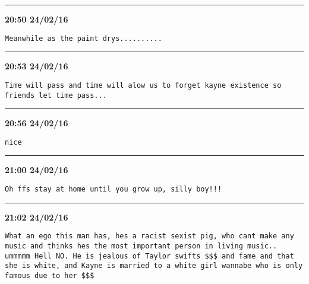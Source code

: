 \hrule%

\begin{adjustwidth}{0cm}{0cm}
\footnotesize \textbf{20:50 24/02/16}

\begin{lstlisting}[breaklines, breakatwhitespace, basicstyle=\small, frame=leftline]
Meanwhile as the paint drys..........
\end{lstlisting}
\end{adjustwidth}

\hrule%

\begin{adjustwidth}{0cm}{0cm}
\footnotesize \textbf{20:53 24/02/16}

\begin{lstlisting}[breaklines, breakatwhitespace, basicstyle=\small, frame=leftline]
Time will pass and time will alow us to forget kayne existence so friends let time pass...
\end{lstlisting}
\end{adjustwidth}

\hrule%

\begin{adjustwidth}{0cm}{0cm}
\footnotesize \textbf{20:56 24/02/16}

\begin{lstlisting}[breaklines, breakatwhitespace, basicstyle=\small, frame=leftline]
nice
\end{lstlisting}
\end{adjustwidth}

\hrule%

\begin{adjustwidth}{0cm}{0cm}
\footnotesize \textbf{21:00 24/02/16}

\begin{lstlisting}[breaklines, breakatwhitespace, basicstyle=\small, frame=leftline]
Oh ffs stay at home until you grow up, silly boy!!!
\end{lstlisting}
\end{adjustwidth}

\hrule%

\begin{adjustwidth}{0cm}{0cm}
\footnotesize \textbf{21:02 24/02/16}

\begin{lstlisting}[breaklines, breakatwhitespace, basicstyle=\small, frame=leftline]
What an ego this man has, hes a racist sexist pig, who cant make any music and thinks hes the most important person in living music.. ummmmm Hell NO. He is jealous of Taylor swifts $$$ and fame and that she is white, and Kayne is married to a white girl wannabe who is only famous due to her $$$
\end{lstlisting}
\end{adjustwidth}

